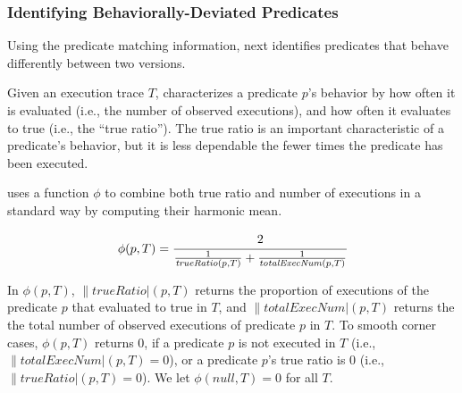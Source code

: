 %

\subsubsection{Identifying Behaviorally-Deviated Predicates}
\label{sec:identify_diff}

Using the predicate matching information, \ourtool next
identifies predicates that behave differently
between two versions. 

Given an execution trace $\mathit{T}$,
\ourtool characterizes a predicate $\mathit{p}$'s behavior by how often
it is evaluated (i.e., the number of observed executions),
and how often it evaluates to true (i.e., the ``true ratio'').
The true ratio is an important characteristic of a predicate's behavior,
but it is less dependable
the fewer times the predicate has been executed.

\ourtool uses a function $\phi$ to combine both true ratio
and number of executions in a standard way by computing their harmonic mean.


\vspace{-2mm}

\begin{equation*}
 \|\phi|(p, T)= \cfrac{2}{\frac{1}{\|trueRatio|(p, T)} + \frac{1}{\|totalExecNum|(p, T)}}
\end{equation*}

\vspace{-1mm}

In $\phi(p, T)$, $\|trueRatio|(p, T)$ returns the proportion of executions of the
predicate $p$ that evaluated to true in $T$,
and $\|totalExecNum|(p, T)$ returns the the total
number of observed executions of predicate $p$ in $T$.
To smooth corner cases, $\phi(p, T)$ returns 0, if a predicate $p$ is not executed in $T$ 
(i.e., $\|totalExecNum|(p, T) = 0$), or
a predicate $p$'s true ratio is 0 (i.e., $\|trueRatio|(p, T) = 0$).
We let $\phi(null, T) = 0$ for all $T$.


